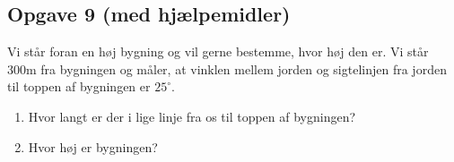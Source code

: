 \subsection*{Opgave 9 (med hjælpemidler)}
Vi står foran en høj bygning og vil gerne bestemme, hvor høj den er. Vi står 300m fra bygningen og måler, at vinklen mellem jorden og sigtelinjen fra jorden til toppen af bygningen er $25^\circ$.
\begin{enumerate}[label=\roman*)]
\item Hvor langt er der i lige linje fra os til toppen af bygningen?
\item Hvor høj er bygningen?
\end{enumerate}